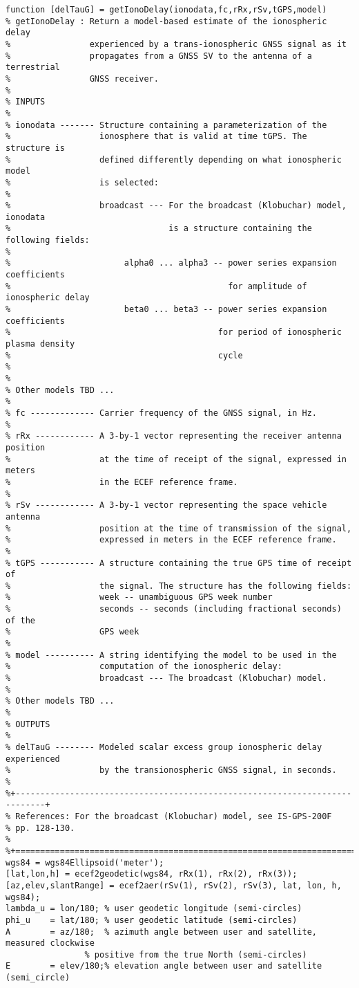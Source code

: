 \begin{lstlisting}
function [delTauG] = getIonoDelay(ionodata,fc,rRx,rSv,tGPS,model)
% getIonoDelay : Return a model-based estimate of the ionospheric delay
%                experienced by a trans-ionospheric GNSS signal as it
%                propagates from a GNSS SV to the antenna of a terrestrial
%                GNSS receiver.
%
% INPUTS
%
% ionodata ------- Structure containing a parameterization of the
%                  ionosphere that is valid at time tGPS. The structure is
%                  defined differently depending on what ionospheric model
%                  is selected:
%
%                  broadcast --- For the broadcast (Klobuchar) model, ionodata
%                                is a structure containing the following fields:
%
%                       alpha0 ... alpha3 -- power series expansion coefficients
%                                            for amplitude of ionospheric delay
%                       beta0 ... beta3 -- power series expansion coefficients
%                                          for period of ionospheric plasma density 
%                                          cycle
%
%
% Other models TBD ...
%
% fc ------------- Carrier frequency of the GNSS signal, in Hz.
%
% rRx ------------ A 3-by-1 vector representing the receiver antenna position
%                  at the time of receipt of the signal, expressed in meters
%                  in the ECEF reference frame.
%
% rSv ------------ A 3-by-1 vector representing the space vehicle antenna
%                  position at the time of transmission of the signal,
%                  expressed in meters in the ECEF reference frame.
%
% tGPS ----------- A structure containing the true GPS time of receipt of
%                  the signal. The structure has the following fields:
%                  week -- unambiguous GPS week number
%                  seconds -- seconds (including fractional seconds) of the
%                  GPS week
%
% model ---------- A string identifying the model to be used in the
%                  computation of the ionospheric delay:
%                  broadcast --- The broadcast (Klobuchar) model.
%
% Other models TBD ...
%
% OUTPUTS
%
% delTauG -------- Modeled scalar excess group ionospheric delay experienced
%                  by the transionospheric GNSS signal, in seconds.
%
%+----------------------------------------------------------------------------+
% References: For the broadcast (Klobuchar) model, see IS-GPS-200F
% pp. 128-130.
%
%+============================================================================+
wgs84 = wgs84Ellipsoid('meter');
[lat,lon,h] = ecef2geodetic(wgs84, rRx(1), rRx(2), rRx(3));
[az,elev,slantRange] = ecef2aer(rSv(1), rSv(2), rSv(3), lat, lon, h, wgs84);
lambda_u = lon/180; % user geodetic longitude (semi-circles)
phi_u    = lat/180; % user geodetic latitude (semi-circles) 
A        = az/180;  % azimuth angle between user and satellite, measured clockwise 
                % positive from the true North (semi-circles) 
E        = elev/180;% elevation angle between user and satellite (semi_circle)


\end{lstlisting}
